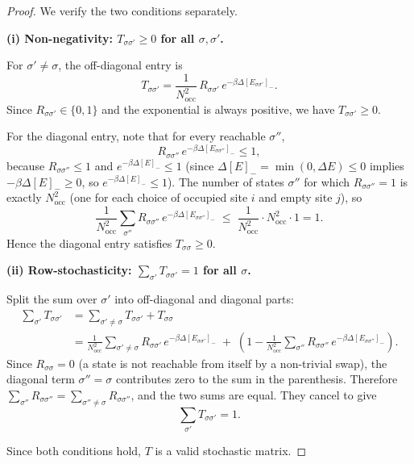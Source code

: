 \documentclass[12pt, a4paper]{article}
\theoremstyle{definition}
\begin{document}
\begin{proof}
We verify the two conditions separately.

\textbf{(i) Non-negativity: $T_{\sigma\sigma'} \geq 0$ for all $\sigma, \sigma'$.}

For $\sigma' \neq \sigma$, the off-diagonal entry is
\[
    T_{\sigma\sigma'} 
    = \frac{1}{N_{\mathrm{occ}}^2}\,R_{\sigma\sigma'}\,
      e^{-\beta\Delta[E_{\sigma\sigma'}]_-}.
\]
Since $R_{\sigma\sigma'} \in \{0,1\}$ and the exponential is always positive,
we have $T_{\sigma\sigma'} \geq 0$.

For the diagonal entry, note that for every reachable $\sigma''$,
\[
    R_{\sigma\sigma''}\,e^{-\beta\Delta[E_{\sigma\sigma''}]_-} \leq 1,
\]
because $R_{\sigma\sigma''} \leq 1$ and $e^{-\beta\Delta[E]_-} \leq 1$
(since $\Delta[E]_- = \min(0,\Delta E) \leq 0$ implies
$-\beta\Delta[E]_- \geq 0$, so $e^{-\beta\Delta[E]_-} \leq 1$).
The number of states $\sigma''$ for which $R_{\sigma\sigma''} = 1$ is exactly
$N_{\mathrm{occ}}^2$ (one for each choice of occupied site $i$ and empty
site $j$), so
\[
    \frac{1}{N_{\mathrm{occ}}^2}
    \sum_{\sigma''} R_{\sigma\sigma''}\,e^{-\beta\Delta[E_{\sigma\sigma''}]_-}
    \;\leq\;
    \frac{1}{N_{\mathrm{occ}}^2}\cdot N_{\mathrm{occ}}^2 \cdot 1 = 1.
\]
Hence the diagonal entry satisfies $T_{\sigma\sigma} \geq 0$.

\textbf{(ii) Row-stochasticity: $\sum_{\sigma'} T_{\sigma\sigma'} = 1$ for all $\sigma$.}

Split the sum over $\sigma'$ into off-diagonal and diagonal parts:
\begin{align*}
    \sum_{\sigma'} T_{\sigma\sigma'}
    &= \sum_{\sigma' \neq \sigma} T_{\sigma\sigma'} + T_{\sigma\sigma} \\[4pt]
    &= \frac{1}{N_{\mathrm{occ}}^2}
       \sum_{\sigma' \neq \sigma}
       R_{\sigma\sigma'}\,e^{-\beta\Delta[E_{\sigma\sigma'}]_-}
       \;+\;
       \left(
         1 - \frac{1}{N_{\mathrm{occ}}^2}
         \sum_{\sigma''} R_{\sigma\sigma''}\,
         e^{-\beta\Delta[E_{\sigma\sigma''}]_-}
       \right).
\end{align*}
Since $R_{\sigma\sigma} = 0$ (a state is not reachable from itself by a
non-trivial swap), the diagonal term $\sigma'' = \sigma$ contributes zero
to the sum in the parenthesis.
Therefore $\sum_{\sigma''} R_{\sigma\sigma''} = \sum_{\sigma'' \neq \sigma}
R_{\sigma\sigma''}$, and the two sums are equal.
They cancel to give
\[
    \sum_{\sigma'} T_{\sigma\sigma'} = 1.
\]

Since both conditions hold, $T$ is a valid stochastic matrix.
\end{proof}
\end{document}
